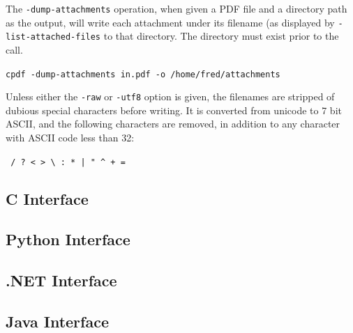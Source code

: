 \documentclass{book}
\begin{document}
The \texttt{-dump-attachments} operation, when given a PDF file and a directory path as the output, will write each attachment under its filename (as displayed by \texttt{-list-attached-files} to that directory. The directory must exist prior to the call.

  \begin{framed}
    \noindent\small\verb!cpdf -dump-attachments in.pdf -o /home/fred/attachments!
  \end{framed}

\noindent  Unless either the \texttt{-raw} or \texttt{-utf8} option is given, the filenames are stripped of dubious special characters before writing. It is converted from unicode to 7 bit ASCII, and the following characters are removed, in addition to any character with ASCII code less than 32:
  \begin{framed}
  \centering
  \verb! / ? < > \ : * | " ^ + =!
  \end{framed}


\begin{cpdflib}
\clearpage
\section*{C Interface}
\begin{small}\tt

\end{small}
\end{cpdflib}

\begin{pycpdflib}
\clearpage
\section*{Python Interface}
\begin{small}\tt

\end{small}
\end{pycpdflib}

\begin{dotnetcpdflib}
\clearpage
\section*{.NET Interface}
\begin{small}\tt

\end{small}
\end{dotnetcpdflib}

\begin{jcpdflib}
\clearpage
\section*{Java Interface}
\begin{small}\tt

\end{small}
\end{jcpdflib}
\end{document}
